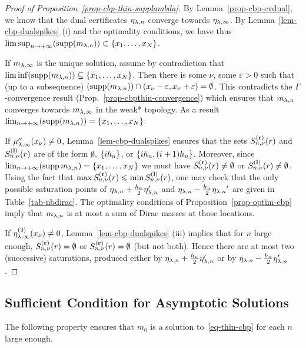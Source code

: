 \begin{proof}[Proof of Proposition~\ref{prop-cbp-thin-supplambda}]
  By Lemma~\ref{prop-cbp-cvdual}, we know that the dual certificates $\eta_{\lambda,n}$ converge towards $\eta_{\lambda,\infty}$. By Lemma~\ref{lem-cbp-dualspikes} (i) and the optimality conditions, we have thus $\limsup_{n\to+\infty} (\operatorname{supp}(m_{\lambda,n}))\subset \{x_1,\ldots,x_N\}$.
  
  If $m_{\lambda,\infty}$ is the unique solution, assume by contradiction that $\liminf (\operatorname{supp} (m_{\lambda,n}))\subsetneq \{x_1,\ldots,x_N\}$. Then there is some $\nu$, some $\varepsilon>0$ such that (up to a subsequence) $(\operatorname{supp}(m_{\lambda,n}))\cap (x_\nu-\varepsilon,x_\nu+\varepsilon)=\emptyset$. This contradicts the $\Gamma$-convergence result (Prop.~\ref{prop-cbpthin-convergence}) which ensures that $m_{\lambda,n}$ converges towards $m_{\lambda,\infty}$ in the weak* topology. As a result $\lim_{n\to+\infty} (\operatorname{supp} (m_{\lambda,n}))=\{x_1,\ldots,x_N\}$.

  If $\mu_{\lambda,\infty}''(x_\nu)\neq 0$, Lemma~\ref{lem-cbp-dualspikes} ensures that the sets $S_{n,\nu}^{\mathbf{(r)}}(r)$ and $S_{n,\nu}^{\mathbf{(l)}}(r)$ are of the form $\emptyset$, $\{i{h_n}\}$, or $\{i{h_n},(i+1){h_n}\}$. Moreover, since $\lim_{n\to+\infty} (\operatorname{supp} m_{\lambda,n})=\{x_1,\ldots,x_N\}$ we must have $S_{n,\nu}^{\mathbf{(r)}}(r)\neq \emptyset$ or $S_{n,\nu}^{\mathbf{(l)}}(r)\neq \emptyset$. Using the fact that $\max S_{n,\nu}^{\mathbf{(r)}}(r)  \leqslant \min S_{n,\nu}^{\mathbf{(l)}}(r)$, one may check that the only possible saturation points of $\eta_{\lambda,n}+\frac{{h_n}}{2}\eta_{\lambda,n}'$ and  $\eta_{\lambda,n}-\frac{{h_n}}{2}{\eta_{\lambda,n}}'$ are given in Table~\ref{tab-nbdirac}. The optimality conditions of Proposition~\ref{prop-optim-cbp} imply that $m_{\lambda,n}$ is at most a sum of Dirac masses at those locations.

  If $\eta_{\lambda,\infty}^{(3)}(x_\nu)\neq 0$, Lemma~\ref{lem-cbp-dualspikes} (iii) implies that for $n$ large enough, $S_{n,\nu}^{\mathbf{(r)}}(r)=\emptyset$ or $S_{n,\nu}^{\mathbf{(r)}}(r)=\emptyset$ (but not both). Hence there are at most two (successive) saturations, produced either by $\eta_{\lambda,n}+\frac{{h_n}}{2} \eta_{\lambda,n}'$ or by $\eta_{\lambda,n}-\frac{{h_n}}{2}\eta_{\lambda,n}'$.
\end{proof}



\subsection{Sufficient Condition for Asymptotic Solutions}
\label{sec-asymp-sol}

The following property ensures that $m_0$ is a solution to~\eqref{eq-thin-cbp} for each $n$ large enough.

